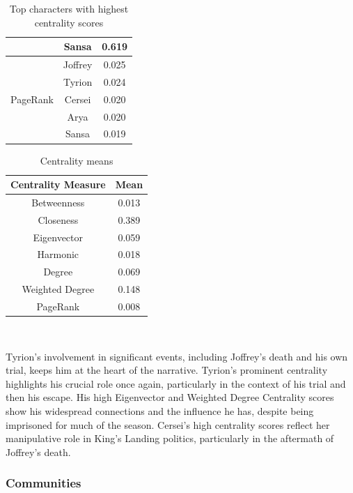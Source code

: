 \documentclass[10pt,twocolumn,letterpaper]{article}
\begin{document}
\begin{table}[!h]
\begin{tabular}{c|c|c}
                    & Sansa & 0.619 \\
        \hline
                    & Joffrey & 0.025 \\
                    & Tyrion & 0.024 \\
        PageRank    & Cersei & 0.020 \\
                    & Arya & 0.020 \\
                    & Sansa & 0.019 \\
        \hline
    \end{tabular}
    \vspace{0.2cm}
    \caption{Top characters with highest centrality scores}
    \label{tab:my_label}
\end{table}


\begin{table}[!h]
    \centering
    \begin{tabular}{c|c}
        Centrality Measure & Mean  \\
        \hline
        Betweenness & 0.013 \\
        Closeness & 0.389 \\
        Eigenvector & 0.059 \\
        Harmonic & 0.018 \\
        Degree & 0.069 \\
        Weighted Degree & 0.148 \\
        PageRank & 0.008 \\
        \hline 
    \end{tabular} \\
    \caption{Centrality means}
    \label{tab:my_label}
\end{table}


Tyrion's involvement in significant events, including Joffrey's death and his own trial, keeps him at the heart of the narrative. Tyrion's prominent centrality highlights his crucial role once again, particularly in the context of his trial and then his escape. His high Eigenvector and Weighted Degree Centrality scores show his widespread connections and the influence he has, despite being imprisoned for much of the season. Cersei's high centrality scores reflect her manipulative role in King's Landing politics, particularly in the aftermath of Joffrey's death.

\subsubsection{Communities}
\end{document}
